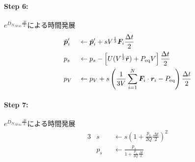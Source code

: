 \paragraph{Step 6:}
$e^{D_{\mathcal{H}_{\mathrm{NPA}3}} \frac{\Delta t}{2}}$による時間発展
\begin{alignat}{3}
  & \Tilde{\bm{p}}_{i}^{\prime} && \gets
  \Tilde{\bm{p}}_{i}^{\prime}
  +
  s V^{\frac{1}{3}} \bm{F}_{i} \frac{\Delta t}{2}
  \\
  & p_{s} && \gets
  p_{s}
  -
  \left[
    U(V^{\frac{1}{3}} \Tilde{\bm{r}}) + P_{\mathrm{eq}}V
  \right] \frac{\Delta t}{2}
  \\
  & p_{V} && \gets
  p_{V}
  +
  s
  \left(
    \frac{1}{3V}
    \sum_{i=1}^{N} \bm{F}_{i} \cdot \bm{r}_{i}
    -
    P_{\mathrm{eq}}
  \right) \frac{\Delta t}{2}
\end{alignat}

\paragraph{Step 7:}
$e^{D_{\mathcal{H}_{\mathrm{NPA}4}} \frac{\Delta t}{2}}$による時間発展
\begin{alignat}{3}
  & s && \gets
  s
  \left(
    1 + \frac{p_{s}}{2Q} \frac{\Delta t}{2}
  \right)^{2}
  \\
  & p_{s} && \gets
  \frac{p_{s}}{1 + \frac{p_{s}}{2Q} \frac{\Delta t}{2}}
\end{alignat}

\clearpage



